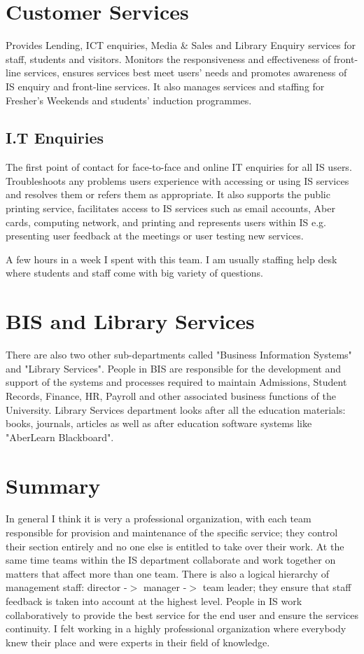 \documentclass[10pt,a4paper,headinclude=true]{report}
\begin{document}
\section{Customer Services}
Provides Lending, ICT enquiries, Media \& Sales and Library Enquiry services for staff, students and visitors. Monitors the responsiveness and effectiveness of front-line services, ensures services best meet users' needs and promotes awareness of IS enquiry and front-line services. It also manages services and staffing for Fresher's Weekends and students' induction programmes.\cite{InternalTeamdescription}
\subsection{I.T Enquiries}
The first point of contact for face-to-face and online IT enquiries for all IS users. Troubleshoots any problems users experience with accessing or using IS services and resolves them or refers them as appropriate. It also supports the public printing service, facilitates access to IS services such as email accounts, Aber cards, computing network, and printing and represents users within IS e.g. presenting user feedback at the meetings or user testing new services. \cite{InternalTeamdescription}

A few hours in a week I spent with this team. I am usually staffing help desk where students and staff come with big variety of questions.

\section{BIS and Library Services}
There are also two other sub-departments called "Business Information Systems" and "Library Services". People in BIS are  responsible for the development and support of the systems and processes required to maintain Admissions, Student Records, Finance, HR, Payroll and other associated business functions of the University. Library Services department looks after all the education materials: books, journals, articles as well as after education software systems like "AberLearn Blackboard".\cite{InternalTeamdescription}

\section{Summary}
In general I think it is very a professional organization, with each team responsible for provision and maintenance of the specific service; they control their section entirely and no one else is entitled to take over their work. At the same time teams within the IS department collaborate and work together on matters that affect more than one team. There is also a logical hierarchy of management staff: director -$>$ manager -$>$ team leader; they ensure that staff feedback is taken into account at the highest level. People in IS work collaboratively to provide the best service for the end user and ensure the services continuity. I felt working in a highly professional organization where everybody knew their place and were experts in their field of knowledge.
\end{document}
